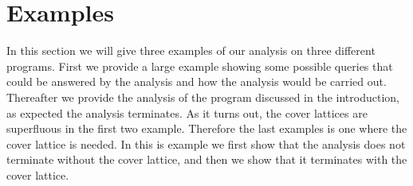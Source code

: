 \section{Examples}\label{sec:example}
In this section we will give three examples of our analysis on three different programs.
First we provide a large example showing some possible queries that could be answered by the analysis and how the analysis would be carried out.
Thereafter we provide the analysis of the program discussed in the introduction, as expected the analysis terminates.
As it turns out, the cover lattices are superfluous in the first two example.
Therefore the last examples is one where the cover lattice is needed.
In this is example we first show that the analysis does not terminate without the cover lattice, and then we show that it terminates with the cover lattice.





